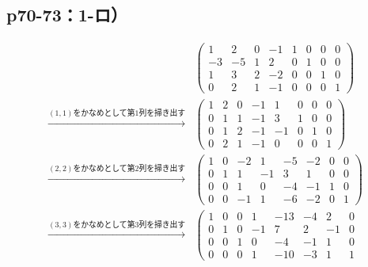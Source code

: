 \documentclass[uplatex,dvipdfmx,a4paper,10pt,fleqn]{jsarticle}
\begin{document}
\subsection*{p70-73：1-ロ）}
        \begin{leftbar}
        \begin{align*} 
        &
        \left( 
            \begin{array}{cccc|cccc}
            1 & 2 & 0 & -1 & 1 & 0 & 0 & 0\\ 
            -3 & -5 & 1 & 2 & 0 & 1 & 0 & 0 \\ 
            1 & 3 & 2 & -2 & 0 & 0 & 1 & 0 \\
            0 & 2 & 1 & -1 & 0 & 0 & 0 & 1 
            \end{array}
            \right) \\
           \xrightarrow{\text{$(1,1)$をかなめとして第$1$列を掃き出す}} &
            \left( \begin{array}{cccc|cccc}
            1 & 2 & 0 & -1 & 1 & 0 & 0 & 0\\ 
            0 & 1 & 1 & -1 & 3 & 1 & 0 & 0 \\
            0 & 1 & 2 & -1 & -1 & 0 & 1 & 0 \\
            0 & 2 & 1 & -1 & 0 & 0 & 0 & 1 
            \end{array}
            \right) \\
           \xrightarrow{\text{$(2,2)$をかなめとして第$2$列を掃き出す}} &
           \left( \begin{array}{cccc|cccc}
            1 & 0 & -2 & 1 & -5 & -2 & 0 & 0\\ 
            0 & 1 & 1 & -1 & 3 & 1 & 0 & 0 \\
            0 & 0 & 1 & 0 & -4 & -1 & 1 & 0 \\
            0 & 0 & -1 & 1 & -6 & -2 & 0 & 1 
            \end{array}
            \right) \\
           \xrightarrow{\text{$(3,3)$をかなめとして第$3$列を掃き出す}} &
           \left( \begin{array}{cccc|cccc}
            1 & 0 & 0 & 1 & -13 & -4 & 2 & 0\\ 
            0 & 1 & 0 & -1 & 7 & 2 & -1 & 0 \\
            0 & 0 & 1 & 0 & -4 & -1 & 1 & 0 \\
            0 & 0 & 0 & 1 & -10 & -3 & 1 & 1 
            \end{array}

\end{align*}
\end{leftbar}
\end{document}
